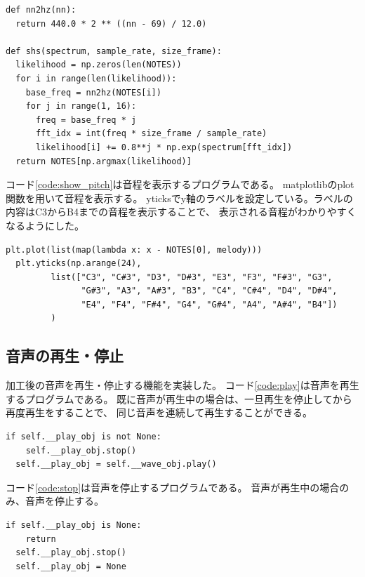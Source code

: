 \documentclass[a4paper,11pt]{jsarticle}
\begin{document}
\begin{lstlisting}[caption=音程計算,label=code:calc_pitch]
def nn2hz(nn):
  return 440.0 * 2 ** ((nn - 69) / 12.0)

def shs(spectrum, sample_rate, size_frame):
  likelihood = np.zeros(len(NOTES))
  for i in range(len(likelihood)):
    base_freq = nn2hz(NOTES[i])
    for j in range(1, 16):
      freq = base_freq * j
      fft_idx = int(freq * size_frame / sample_rate)
      likelihood[i] += 0.8**j * np.exp(spectrum[fft_idx])
  return NOTES[np.argmax(likelihood)]

\end{lstlisting}

コード\ref{code:show_pitch}は音程を表示するプログラムである。
matplotlibのplot関数を用いて音程を表示する。
yticksでy軸のラベルを設定している。ラベルの内容はC3からB4までの音程を表示することで、
表示される音程がわかりやすくなるようにした。

\begin{lstlisting}[caption=音程表示,label=code:show_pitch]
  plt.plot(list(map(lambda x: x - NOTES[0], melody)))
  plt.yticks(np.arange(24),
         list(["C3", "C#3", "D3", "D#3", "E3", "F3", "F#3", "G3",
               "G#3", "A3", "A#3", "B3", "C4", "C#4", "D4", "D#4",
               "E4", "F4", "F#4", "G4", "G#4", "A4", "A#4", "B4"])
         )
\end{lstlisting}

\subsection{音声の再生・停止}

加工後の音声を再生・停止する機能を実装した。
コード\ref{code:play}は音声を再生するプログラムである。
既に音声が再生中の場合は、一旦再生を停止してから再度再生をすることで、
同じ音声を連続して再生することができる。

\begin{lstlisting}[caption=音声再生,label=code:play]
  if self.__play_obj is not None:
    self.__play_obj.stop()
  self.__play_obj = self.__wave_obj.play()
\end{lstlisting}

コード\ref{code:stop}は音声を停止するプログラムである。
音声が再生中の場合のみ、音声を停止する。

\begin{lstlisting}[caption=音声停止,label=code:stop]
  if self.__play_obj is None:
    return
  self.__play_obj.stop()
  self.__play_obj = None

\end{lstlisting}
\end{document}
